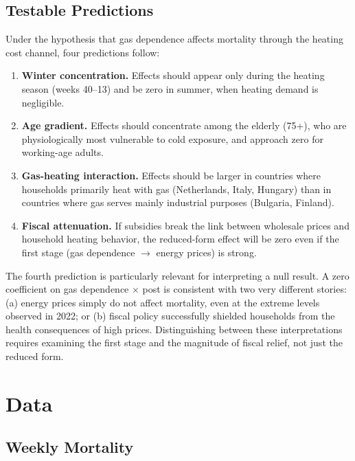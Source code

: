 \documentclass[12pt]{article}
\begin{document}
\subsection{Testable Predictions}

Under the hypothesis that gas dependence affects mortality through the heating cost channel, four predictions follow:

\begin{enumerate}
\item \textbf{Winter concentration.} Effects should appear only during the heating season (weeks 40--13) and be zero in summer, when heating demand is negligible.
\item \textbf{Age gradient.} Effects should concentrate among the elderly (75+), who are physiologically most vulnerable to cold exposure, and approach zero for working-age adults.
\item \textbf{Gas-heating interaction.} Effects should be larger in countries where households primarily heat with gas (Netherlands, Italy, Hungary) than in countries where gas serves mainly industrial purposes (Bulgaria, Finland).
\item \textbf{Fiscal attenuation.} If subsidies break the link between wholesale prices and household heating behavior, the reduced-form effect will be zero even if the first stage (gas dependence $\to$ energy prices) is strong.
\end{enumerate}

The fourth prediction is particularly relevant for interpreting a null result. A zero coefficient on gas dependence $\times$ post is consistent with two very different stories: (a) energy prices simply do not affect mortality, even at the extreme levels observed in 2022; or (b) fiscal policy successfully shielded households from the health consequences of high prices. Distinguishing between these interpretations requires examining the first stage and the magnitude of fiscal relief, not just the reduced form.


\section{Data}
\label{sec:data}

\subsection{Weekly Mortality}
\end{document}

